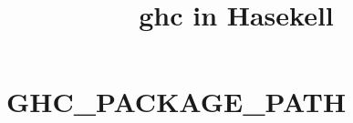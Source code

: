 \documentclass[a4paper]{moderncv}
\title{ghc in Hasekell}
\begin{document}

\maketitle

\section{GHC_PACKAGE_PATH}
\cventry{}{}{}{}{}{}
\end{document}
